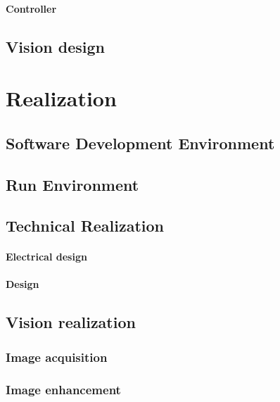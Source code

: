 \documentclass[11pt,fleqn,,a4paper,twoside,openright]{book}
\begin{document}
\subsection{Controller}

\chapter{Vision design}

\part{Realization}

\chapter{Software Development Environment}


\chapter{Run Environment}


\chapter{Technical Realization}

\subsection{Electrical design}

\subsection{Design}

\chapter{Vision realization}


\section{Image acquisition}


\section{Image enhancement}

\end{document}
